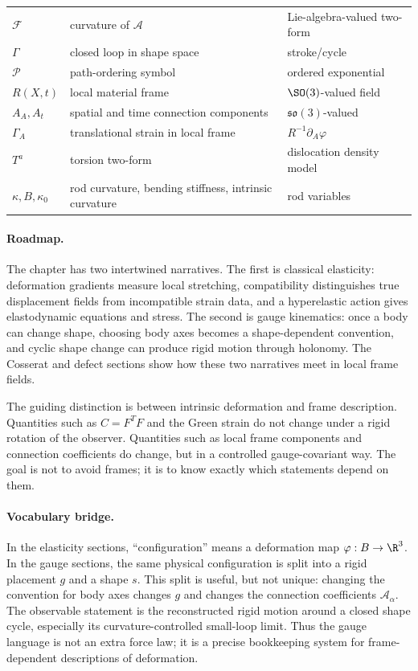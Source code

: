 \begin{table}[htbp]
\begin{tabular}{p{}p{}p{}}
\(\mathcal F\) & curvature of \(\mathcal A\) & Lie-algebra-valued two-form\\
\(\Gamma\) & closed loop in shape space & stroke/cycle\\
\(\mathcal P\) & path-ordering symbol & ordered exponential\\
\(R(X,t)\) & local material frame & \(\SO(3)\)-valued field\\
\(A_A,A_t\) & spatial and time connection components & \(\mathfrak{so}(3)\)-valued\\
\(\Gamma_A\) & translational strain in local frame & \(R^{-1}\partial_A\varphi\)\\
\(T^a\) & torsion two-form & dislocation density model\\
\(\kappa,B,\kappa_0\) & rod curvature, bending stiffness, intrinsic curvature & rod variables\\
\bottomrule
\end{tabular}
\end{table}

\paragraph{Roadmap.}
The chapter has two intertwined narratives. The first is classical elasticity:
deformation gradients measure local stretching, compatibility distinguishes
true displacement fields from incompatible strain data, and a hyperelastic
action gives elastodynamic equations and stress. The second is gauge
kinematics: once a body can change shape, choosing body axes becomes a
shape-dependent convention, and cyclic shape change can produce rigid motion
through holonomy. The Cosserat and defect sections show how these two
narratives meet in local frame fields.

The guiding distinction is between intrinsic deformation and frame description.
Quantities such as \(C=F^TF\) and the Green strain do not change under a rigid
rotation of the observer. Quantities such as local frame components and
connection coefficients do change, but in a controlled gauge-covariant way. The
goal is not to avoid frames; it is to know exactly which statements depend on
them.

\paragraph{Vocabulary bridge.}
In the elasticity sections, ``configuration'' means a deformation map
\(\varphi:B\to\R^3\). In the gauge sections, the same physical configuration is
split into a rigid placement \(g\) and a shape \(s\). This split is useful, but
not unique: changing the convention for body axes changes \(g\) and changes the
connection coefficients \(\mathcal A_\alpha\). The observable statement is the
reconstructed rigid motion around a closed shape cycle, especially its
curvature-controlled small-loop limit. Thus the gauge language is not an extra
force law; it is a precise bookkeeping system for frame-dependent descriptions
of deformation.

